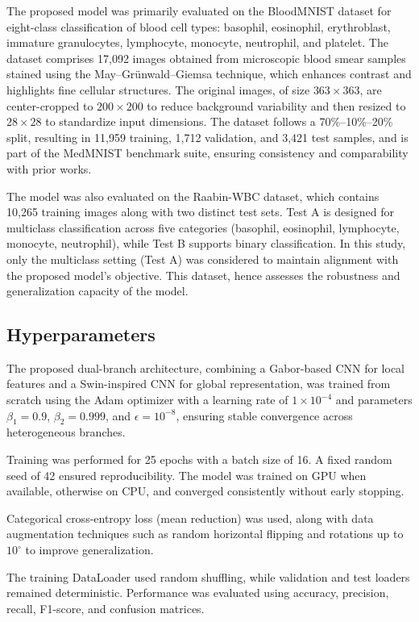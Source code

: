 \documentclass[12pt]{article}
\begin{document}
The proposed model was primarily evaluated on the BloodMNIST dataset for eight-class classification of blood cell types: basophil, eosinophil, erythroblast, immature granulocytes, lymphocyte, monocyte, neutrophil, and platelet. The dataset comprises 17,092 images obtained from microscopic blood smear samples stained using the May–Grünwald–Giemsa technique, which enhances contrast and highlights fine cellular structures. The original images, of size $363 \times 363$, are center-cropped to $200 \times 200$ to reduce background variability and then resized to $28 \times 28$ to standardize input dimensions. The dataset follows a 70\%–10\%–20\% split, resulting in 11,959 training, 1,712 validation, and 3,421 test samples, and is part of the MedMNIST benchmark suite, ensuring consistency and comparability with prior works.

The model was also evaluated on the Raabin-WBC dataset, which contains 10,265 training images along with two distinct test sets. Test A is designed for multiclass classification across five categories (basophil, eosinophil, lymphocyte, monocyte, neutrophil), while Test B supports binary classification. In this study, only the multiclass setting (Test A) was considered to maintain alignment with the proposed model’s objective. This dataset, hence assesses the robustness and generalization capacity of the model. 

\subsection{Hyperparameters}

The proposed dual-branch architecture, combining a Gabor-based CNN for local features and a Swin-inspired CNN for global representation, was trained from scratch using the Adam optimizer with a learning rate of $1\times10^{-4}$ and parameters $\beta_1=0.9$, $\beta_2=0.999$, and $\epsilon=10^{-8}$, ensuring stable convergence across heterogeneous branches.

Training was performed for 25 epochs with a batch size of 16. A fixed random seed of 42 ensured reproducibility. The model was trained on GPU when available, otherwise on CPU, and converged consistently without early stopping.

Categorical cross-entropy loss (mean reduction) was used, along with data augmentation techniques such as random horizontal flipping and rotations up to $10^\circ$ to improve generalization.

The training DataLoader used random shuffling, while validation and test loaders remained deterministic. Performance was evaluated using accuracy, precision, recall, F1-score, and confusion matrices.
\end{document}
